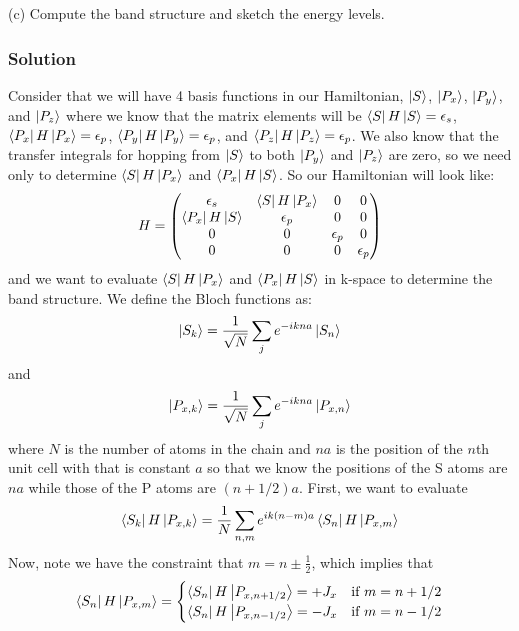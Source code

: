 \documentclass{article}
\begin{document}
\subsection{}
(c) Compute the band structure and sketch the energy levels.\\
\subsubsection{Solution}
Consider that we will have 4 basis functions in our Hamiltonian, $\ket{S}$, $\ket{P_x}$, $\ket{P_y}$, and $\ket{P_z}$ where we know that the matrix elements will be $\bra{S}H\ket{S}=\epsilon_s$, $\bra{P_x}H\ket{P_x}=\epsilon_p$, $\bra{P_y}H\ket{P_y}=\epsilon_p$, and $\bra{P_z}H\ket{P_z}=\epsilon_p$. We also know that the transfer integrals for hopping from $\ket{S}$ to both $\ket{P_y}$ and $\ket{P_z}$ are zero, so we need only to determine $\bra{S}H\ket{P_x}$ and $\bra{P_x}H\ket{S}$. So our Hamiltonian will look like:
\begin{equation}
    H = \begin{pmatrix}
    \epsilon_s & \bra{S}H\ket{P_x} & 0 & 0\\
    \bra{P_x}H\ket{S} & \epsilon_p & 0 & 0\\
    0 & 0 & \epsilon_p & 0\\
    0 & 0 & 0 & \epsilon_p 
    \end{pmatrix}
\end{equation}
and we want to evaluate $\bra{S}H\ket{P_x}$ and $\bra{P_x}H\ket{S}$ in k-space to determine the band structure. We define the Bloch functions as:
\begin{equation}
    \ket{S_k} = \frac{1}{\sqrt{N}}\sum_{j}e^{-ikna}\ket{S_n}
\end{equation}
and
\begin{equation}
    \ket{P_{x,k}} = \frac{1}{\sqrt{N}}\sum_{j}e^{-ikna}\ket{P_{x,n}}
\end{equation}
where $N$ is the number of atoms in the chain and $na$ is the position of the $n$th unit cell with that is constant $a$ so that we know the positions of the S atoms are $na$ while those of the P atoms are $(n+1/2)a$. First, we want to evaluate
\begin{equation}
    \bra{S_k}H\ket{P_{x,k}} = \frac{1}{N}\sum_{n,m}e^{ik(n-m)a}\bra{S_n}H\ket{P_{x,m}}
\end{equation}
Now, note we have the constraint that $m=n\pm\frac{1}{2}$, which implies that
\begin{equation}
    \bra{S_n}H\ket{P_{x,m}} = \begin{cases}
    \bra{S_n}H\ket{P_{x,n+1/2}}=+J_x & \text{if } m=n+1/2\\
    \bra{S_n}H\ket{P_{x,n-1/2}}=-J_x& \text{if } m=n-1/2
    \end{cases}
\end{equation}
\end{document}
